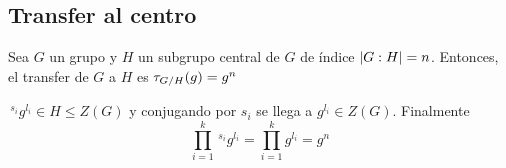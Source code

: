 
\subsection{Transfer al centro}

\begin{proposicion}
	Sea $G$ un grupo y $H$ un subgrupo central de $G$ de índice $\left|G:H\right|=n$. Entonces, el transfer de $G$ a $H$ es $\tau_{G/ H} (g) = g^{n}$
	\begin{demostracion}
		$\,^{s_i}g^{l_i}\in H\leq Z(G)$ y conjugando por $s_i$ se llega a $g^{l_i}\in Z(G)$. Finalmente 
		\begin{equation}
			\prod_{i=1}^k \,^{s_i}g^{l_i} = \prod_{i=1}^k g^{l_i} = g^n
		\end{equation}
	\end{demostracion}
\end{proposicion}


